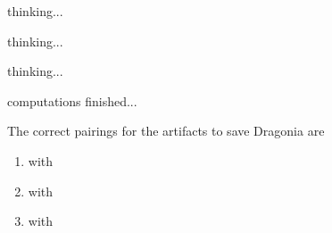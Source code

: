 \documentclass[white]{guildcamp3}
\begin{document}
\name{\wEndWorldThree{}} %

thinking...

thinking...

thinking...

computations finished...

The correct pairings for the artifacts to save Dragonia are

\begin{enumerate}
	\item \iMagicArtifactOne{} with \iTechArtifactTwo{}

	\item \iMagicArtifactTwo{} with \iTechArtifactOne{}

	\item \iMagicArtifactThree{} with \iTechArtifactThree{}
\end{enumerate}

\end{document}
